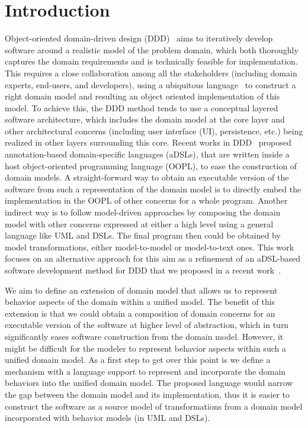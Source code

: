 %
\section{Introduction}\label{sect:introduction}
Object-oriented domain-driven design (DDD)~\cite{evans_domain-driven_2004} aims to iteratively develop software around a realistic model of the problem domain, which both thoroughly captures the domain requirements and is technically feasible for implementation. This requires a close collaboration among all the stakeholders (including domain experts, end-users, and developers), using a ubiquitous language~\cite{evans_domain-driven_2004} to construct a right domain model and resulting an object oriented implementation of this model. To achieve this, the DDD method tends to use a conceptual layered software architecture, which includes the domain model at the core layer and other architectural concerns (including user interface (UI), persistence, etc.) being realized in other layers surrounding this core. %
%
%
Recent works in DDD~\cite{dan_haywood_apache_2013, paniza_learn_2011} proposed  annotation-based domain-specific languages (aDSLs), that are written inside a host object-oriented programming language (OOPL), to ease the construction of domain models. A straight-forward way to obtain an executable version of the software from such a representation of the domain model is to directly embed the implementation in the OOPL of other concerns for a whole program. Another indirect way is to follow model-driven approaches by composing the domain model with other concerns expressed at either a high level using a general language like UML and DSLs. The final program then could be obtained by model transformations, either model-to-model or model-to-text ones. This work focuses on an alternative approach for this aim as a refinement of an aDSL-based software development method for DDD that we proposed in a recent work~\cite{le_domain_2018}.

We aim to define an extension of domain model that allows us to represent behavior aspects of the domain within a unified model. The benefit of this extension is that we could obtain a composition of domain concerns for an executable version of the software at higher level of abstraction, which in turn significantly eases software construction from the domain model. However, it might be difficult for the modeler to represent behavior aspects within such a unified domain model. As a first step to get over this point is we define a mechanism with a language support to represent and incorporate the domain behaviors into the unified domain model. The proposed language would narrow the gap between the domain model and its implementation, thus it is easier to construct the software as a source model of transformations from a domain model incorporated with behavior models (in UML and DSLs).

